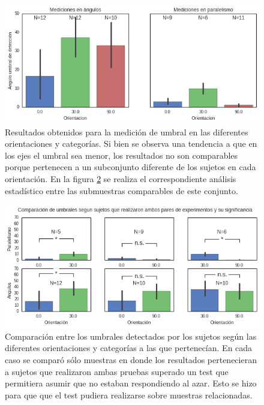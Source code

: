 \documentclass{article}
\begin{document}
    \begin{figure}
        \center
        \includegraphics[width=\textwidth]{Imagenes/Exp1_Resultados.png}
        \caption{Resultados obtenidos para la medición de umbral en las diferentes orientaciones y categorías. Si bien se observa una tendencia a que en los ejes el umbral sea menor, los resultados no son comparables porque pertenecen a un subconjunto diferente de los sujetos en cada orientación. En la figura \ref{fig:Exp1_ResultadosDetalle} se realiza el correspondiente análisis estadístico entre las submuestras comparables de este conjunto.}
        \label{fig:Exp1Resultados}
    \end{figure}  
	
	\begin{figure}
        \center
        \includegraphics[width=\textwidth]{Imagenes/Exp1_ResultadosDetalle.png}
        \caption{Comparación entre los umbrales detectados por los sujetos según las diferentes orientaciones y categorías a las que pertenecían. En cada caso se comparó sólo muestras en donde los resultados pertenecieran a sujetos que realizaron ambas pruebas superado un test que permitiera asumir que no estaban respondiendo al azar. Esto se hizo para que que el test pudiera realizarse sobre muestras relacionadas.}
        \label{fig:Exp1_ResultadosDetalle}
    \end{figure}  
    
\end{document}
